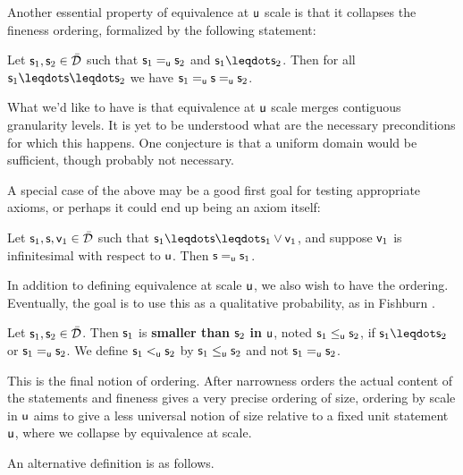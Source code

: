 \documentclass[10pt, onecolumn, longbibliography, nofootinbib]{revtex4-2}
\begin{document}
Another essential property of equivalence at $\stmt[u]$ scale is that it collapses the fineness ordering, formalized by the following statement:

\begin{desid}
	Let $\stmt_1, \stmt_2 \in \tdomain$ such that $\stmt_1 \equ \stmt_2$ and $\stmt_1 \finer \stmt_2$. Then for all $\stmt_1 \finer \stmt \finer \stmt_2$ we have $\stmt_1 \equ \stmt \equ \stmt_2$.
\end{desid}

\begin{remark}
	What we'd like to have is that equivalence at $\stmt[u]$ scale merges contiguous granularity levels. It is yet to be understood what are the necessary preconditions for which this happens. One conjecture is that a uniform domain would be sufficient, though probably not necessary.
\end{remark}

A special case of the above may be a good first goal for testing appropriate axioms, or perhaps it could end up being an axiom itself:

\begin{desid}
	Let $\stmt_1,\stmt,\stmt[v]_1\in\tdomain$ such that $\stmt_1\finer\stmt\finer\stmt_1\OR\stmt[v]_1$, and suppose $\stmt[v]_1$ is infinitesimal with respect to $\stmt[u]$. Then $\stmt\equ\stmt_1$. 
\end{desid}

In addition to defining equivalence at scale $\stmt[u]$, we also wish to have the ordering. Eventually, the goal is to use this as a qualitative probability, as in Fishburn \cite{fishburnsurvey}. 

\begin{defn}\label{smalleru}
	Let $\stmt_1, \stmt_2 \in \tdomain$. Then $\stmt_1$ is \textbf{smaller than} $\stmt_2$ \textbf{in} $\stmt[u]$, noted $\stmt_1 \lequ \stmt_2$, if $\stmt_1 \finer \stmt_2$ or $\stmt_1 \equ \stmt_2$. We define $\stmt_1\leu\stmt_2$ by $\stmt_1\lequ\stmt_2$ and not $\stmt_1\equ\stmt_2$. 
\end{defn}

This is the final notion of ordering. After narrowness orders the actual content of the statements and fineness gives a very precise ordering of size, ordering by scale in $\stmt[u]$ aims to give a less universal notion of size relative to a fixed unit statement $\stmt[u]$, where we collapse by equivalence at scale. 



An alternative definition is as follows. 
\end{document}
